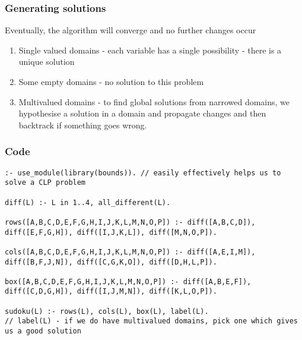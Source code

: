 \documentclass{article}
\begin{document}
\subsubsection{Generating solutions}
Eventually, the algorithm will converge and no further changes occur \begin{enumerate}
	\item Single valued domains - each variable has a single possibility - there is a unique solution
	\item Some empty domains - no solution to this problem
	\item Multivalued domains - to find global solutions from narrowed domains, we hypothesise a solution in a domain and propagate changes and then backtrack if something goes wrong.
\end{enumerate}

\subsubsection{Code}
\begin{lstlisting}
:- use_module(library(bounds)). // easily effectively helps us to solve a CLP problem

diff(L) :- L in 1..4, all_different(L).

rows([A,B,C,D,E,F,G,H,I,J,K,L,M,N,O,P]) :- diff([A,B,C,D]), diff([E,F,G,H]), diff([I,J,K,L]), diff([M,N,O,P]).

cols([A,B,C,D,E,F,G,H,I,J,K,L,M,N,O,P]) :- diff([A,E,I,M]), diff([B,F,J,N]), diff([C,G,K,O]), diff([D,H,L,P]).

box([A,B,C,D,E,F,G,H,I,J,K,L,M,N,O,P]) :- diff([A,B,E,F]), diff([C,D,G,H]), diff([I,J,M,N]), diff([K,L,O,P]).

sudoku(L) :- rows(L), cols(L), box(L), label(L).
// label(L) - if we do have multivalued domains, pick one which gives us a good solution
\end{lstlisting}
\end{document}
